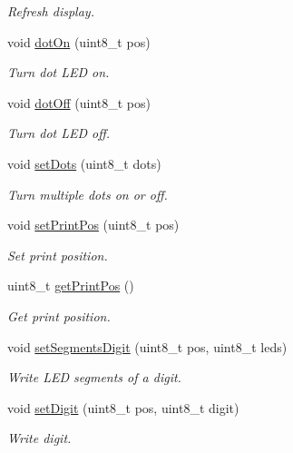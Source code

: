 \begin{DoxyCompactItemize}
\begin{DoxyCompactList}\small\item\em Refresh display. \end{DoxyCompactList}\item 
void \hyperlink{class_l_k_m1638_board_adf22c1b3001db91ed263bd5952b2ea5c}{dot\+On} (uint8\+\_\+t pos)
\begin{DoxyCompactList}\small\item\em Turn dot L\+ED on. \end{DoxyCompactList}\item 
void \hyperlink{class_l_k_m1638_board_ad946f70d7cabf87562fd3482e010462b}{dot\+Off} (uint8\+\_\+t pos)
\begin{DoxyCompactList}\small\item\em Turn dot L\+ED off. \end{DoxyCompactList}\item 
void \hyperlink{class_l_k_m1638_board_a50f9693ca74fef320fb3898cdf4480c4}{set\+Dots} (uint8\+\_\+t dots)
\begin{DoxyCompactList}\small\item\em Turn multiple dots on or off. \end{DoxyCompactList}\item 
void \hyperlink{class_l_k_m1638_board_a6d91010acd57d05179a3d6c2435993f3}{set\+Print\+Pos} (uint8\+\_\+t pos)
\begin{DoxyCompactList}\small\item\em Set print position. \end{DoxyCompactList}\item 
uint8\+\_\+t \hyperlink{class_l_k_m1638_board_ad50f047120592ae1c70de9528475d0f7}{get\+Print\+Pos} ()
\begin{DoxyCompactList}\small\item\em Get print position. \end{DoxyCompactList}\item 
void \hyperlink{class_l_k_m1638_board_afd4d21ac6046c65eac7198e831d959ad}{set\+Segments\+Digit} (uint8\+\_\+t pos, uint8\+\_\+t leds)
\begin{DoxyCompactList}\small\item\em Write L\+ED segments of a digit. \end{DoxyCompactList}\item 
void \hyperlink{class_l_k_m1638_board_a8776f66e796c3ea9e389ea6aa50dcef2}{set\+Digit} (uint8\+\_\+t pos, uint8\+\_\+t digit)
\begin{DoxyCompactList}\small\item\em Write digit. \end{DoxyCompactList}\item 

\end{DoxyCompactItemize}
